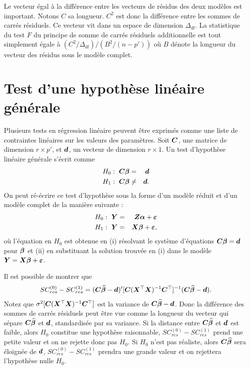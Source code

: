 Le vecteur égal à la différence entre les vecteurs de résidus des
deux mod\`eles est important. Notons $C$ sa longueur. $C^2$ est donc la différence entre les sommes
de carrés résiduels. Ce vecteur vit dans un espace de
dimension $\Delta_{dl}$. La statistique du test $F$ du principe de
somme de carrés résiduels additionnelle est tout simplement
égale \`a $(C^2/\Delta_{dl})/(B^2/(n-p'))$ où $B$ dénote la longueur du vecteur des résidus sous le modèle complet.

\section{Test d'une hypoth\`ese linéaire générale}
\label{sec:hyplingen}

Plusieurs tests en régression linéaire peuvent être exprimés comme une liste de contraintes linéaires sur les valeurs des param\`etres. Soit $\bm{C}$, une matrice de dimension
$r\times p'$, et $\bm{d}$, un vecteur de dimension $r\times1$. Un test d'hypoth\`ese linéaire
générale s'écrit comme
\begin{eqnarray}\label{H0:lingen}
H_0:~\bm{C}\bm\beta&=&\bm{d}\\
H_1:~\bm{C}\bm\beta&\neq&\bm{d}.\nonumber
\end{eqnarray}
On peut ré-écrire ce test d'hypoth\`ese sous la forme d'un mod\`ele réduit et d'un mod\`ele
complet de la manière suivante :
\begin{eqnarray*}
H_0:~\bm{Y}&=&\bm{Z}\bm{\alpha}+\bm\varepsilon\\
H_1:~\bm{Y}&=&\bm{X}\bm\beta+\bm\varepsilon,
\end{eqnarray*}
où l'équation en $H_0$ est obtenue en (i) résolvant le système d'équations
$\bm{C}\bm\beta=\bm{d}$ pour $\bm\beta$ et (ii) en substituant la solution trouvée en (i)
dans le modèle $\bm{Y}=\bm{X}\bm\beta+\bm\varepsilon$.

Il est possible de
montrer \citep[voir par e.g.][pp. 44--45 et pp. 60--64]{Sen_Sri:90} que
$$SC_{res}^{(0)}-SC_{res}^{(1)}=(\bm{C}\widehat{\bm\beta}-\bm{d})'[\bm{C}(\bm{X}^\top\bm{X})^{-1}\bm{C}^\top]^{-1}(\bm{C}
\widehat{\bm\beta}-\bm{d}).$$
Notez que $\sigma^2[\bm{C}(\bm{X}^\top\bm{X})^{-1}\bm{C}^\top]$ est la variance de $\bm{C}\widehat{\bm\beta}-\bm{d}$. Donc
la différence des sommes de carrés résiduels peut \^etre vue comme la longueur du vecteur
qui sépare $\bm{C}\widehat{\bm\beta}$ et $\bm{d}$, standardisée par sa variance. Si la distance entre
$\bm{C}\widehat{\bm\beta}$ et $\bm{d}$ est faible, alors $H_0$ constitue une hypothèse raisonnable, $SC_{res}^{(0)}-
SC_{res}^{(1)}$ prend une petite valeur et on ne rejette donc pas $H_0$. Si $H_0$ n'est pas réaliste, alors
$\bm{C}\widehat{\bm\beta}$ sera éloignée de $\bm{d}$, $SC_{res}^{(0)}-SC_{res}^{(1)}$ prendra une grande valeur
et on rejettera l'hypothèse nulle $H_0$.


